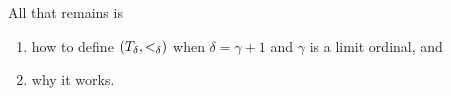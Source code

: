 \begin{boxconstruction}
    All that remains is
    \begin{enumerate}
        \item how to define $\left( T_{\delta}, <_{\delta} \right)$ when $\delta = \gamma + 1$ and $\gamma$ is a limit ordinal, and
        \item why it works.
    \end{enumerate}
    \sorry
\end{boxconstruction}

